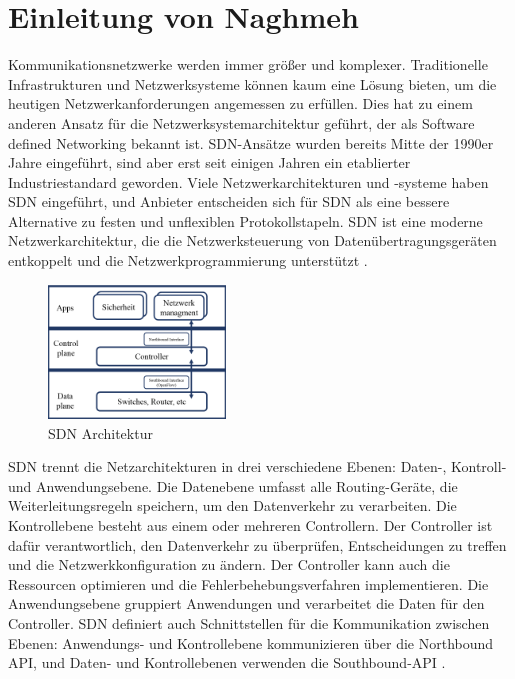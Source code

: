 \documentclass[fontsize=12pt,paper=a4,open=any,parskip=half,
  twoside=false,toc=listof,toc=bibliography,fleqn,leqno,
  captions=nooneline,captions=tableabove,british]{scrbook}
\begin{document}
\newpage
\section*{Einleitung von Naghmeh}\label{einl-naghmeh}
Kommunikationsnetzwerke werden immer größer und komplexer. Traditionelle Infrastrukturen und Netzwerksysteme können kaum eine Lösung bieten, um die heutigen Netzwerkanforderungen angemessen zu erfüllen. Dies hat zu einem anderen Ansatz für die Netzwerksystemarchitektur geführt, der als Software defined Networking bekannt ist. SDN-Ansätze wurden bereits Mitte der 1990er Jahre eingeführt, sind aber erst seit einigen Jahren ein etablierter Industriestandard geworden. Viele Netzwerkarchitekturen und -systeme haben SDN eingeführt, und Anbieter entscheiden sich für SDN als eine bessere Alternative zu festen und unflexiblen Protokollstapeln. SDN ist eine moderne Netzwerkarchitektur, die die Netzwerksteuerung von Datenübertragungsgeräten entkoppelt und die Netzwerkprogrammierung unterstützt \cite{gelberger2013performance}.\par
\begin{figure}
	\vspace{-\baselineskip}
	\centering
	\includegraphics[width=0.42\textwidth]{Bilder/layer3}
	\caption{SDN Architektur}
	\label{layer3}
\end{figure}
SDN trennt die Netzarchitekturen in drei verschiedene Ebenen: Daten-, Kontroll- und Anwendungsebene. Die Datenebene umfasst alle Routing-Geräte, die Weiterleitungsregeln speichern, um den Datenverkehr zu verarbeiten. Die Kontrollebene besteht aus einem oder mehreren Controllern. Der Controller ist dafür verantwortlich, den Datenverkehr zu überprüfen, Entscheidungen zu treffen und die Netzwerkkonfiguration zu ändern. Der Controller kann auch die Ressourcen optimieren und die Fehlerbehebungsverfahren implementieren. Die Anwendungsebene gruppiert Anwendungen und verarbeitet die Daten für den Controller. SDN definiert auch Schnittstellen für die Kommunikation zwischen Ebenen: Anwendungs- und Kontrollebene kommunizieren über die Northbound API, und Daten- und Kontrollebenen verwenden die Southbound-API \cite{rastogi2016comparative}.\par
\end{document}
